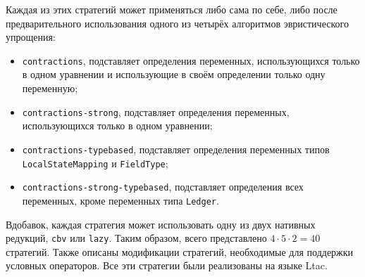 \documentclass[../thesis.tex]{subfiles}
\begin{document}
Каждая из этих стратегий может применяться либо сама по себе, либо после предварительного использования одного из четырёх алгоритмов эвристического упрощения:
\begin{itemize}
    \item \texttt{contractions}, подставляет определения переменных, использующихся только в одном уравнении и использующие в своём определении только одну переменную;
    \item \texttt{contractions-strong}, подставляет определения переменных, использующихся только в одном уравнении;
    \item \texttt{contractions-typebased}, подставляет определения переменных типов\\\texttt{LocalStateMapping} и \texttt{FieldType};
    \item \texttt{contractions-strong-typebased}, подставляет определения всех переменных, кроме переменных типа \texttt{Ledger}.
\end{itemize}

Вдобавок, каждая стратегия может использовать одну из двух нативных редукций, \texttt{cbv} или \texttt{lazy}. Таким образом, всего представлено $4 \cdot 5 \cdot 2 = 40$ стратегий. Также описаны модификации стратегий, необходимые для поддержки условных операторов. Все эти стратегии были реализованы на языке Ltac.
\end{document}
